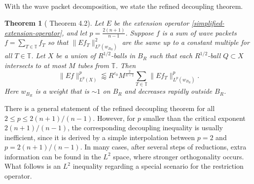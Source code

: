 \documentclass{amsart}
\numberwithin{equation}{section}
\newtheorem{theorem}{Theorem}[section]
\newcommand{\e}{\varepsilon}
\newcommand{\ZT}{\mathbb{T}}
\begin{document}
With the wave packet decomposition, we state the refined decoupling theorem.

\begin{theorem}[\cite{GIOW} Theorem 4.2]
\label{refined-decoupling-thm}
Let $E$ be the extension operator \eqref{simplified-extension-operator}, and let $p=\frac{2(n+1)}{n-1}$. Suppose $f$ is a sum of wave packets $f=\sum_{T\in\ZT}f_T$ so that $\|Ef_T\|_{L^p(w_{B_R})}^2$ are the same up to a constant multiple for all $T\in\ZT$. 
Let $X$ be a union of $R^{1/2}$-balls in $B_R$ such that each $R^{1/2}$-ball $Q\subset X$ intersects to at most $M$ tubes from $\ZT$. 
Then 
\begin{equation}
\label{refined-decoupling}
    \|Ef\|_{L^p(X)}^p\lessapprox R^{\e_0} M^{\frac{2}{n-1}}\sum_{T\in\ZT}\|Ef_T\|_{L^p(w_{B_R})}^p.
\end{equation}
Here $w_{B_R}$ is a weight that is $\sim1$ on $B_R$ and decreases rapidly outside $B_R$. 
\end{theorem}

\smallskip

There is a general statement of the refined decoupling theorem for all $2\leq p\leq 2(n+1)/(n-1)$.
However, for $p$ smaller than the critical exponent $2(n+1)/(n-1)$, the corresponding decoupling inequality is usually inefficient, since it is derived by a simple interpolation between $p=2$ and $p=2(n+1)/(n-1)$.
In many cases, after several steps of reductions, extra information can be found in the $L^2$ space, where stronger orthogonality occurs. 
What follows is an $L^2$ inequality regarding a special scenario for the restriction operator.
\end{document}
